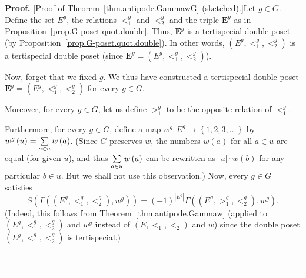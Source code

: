\documentclass[numbers=enddot,12pt,final,onecolumn,notitlepage,abstracton]{scrartcl}
\theoremstyle{definition}
\newenvironment{proof}[1][Proof]{\noindent\textbf{#1.} }{\ \rule{0.5em}{0.5em}}
\let\sumnonlimits\sum
\renewcommand{\sum}{\sumnonlimits\limits}
\newcommand{\EE}{{\mathbf{E}}}
\begin{document}
\begin{proof}
[Proof of Theorem~\ref{thm.antipode.GammawG} (sketched).]Let $g\in G$.
Define the set $E^g$, the relations $<_1^g$ and $<_2^g$
and the triple $\EE^g$ as in Proposition~\ref{prop.G-poset.quot.double}.
Thus, $\EE^g$ is a tertispecial double poset (by
Proposition~\ref{prop.G-poset.quot.double}). In other words,
$\left( E^g, <_1^g, <_2^g \right)$ is a tertispecial double poset
(since $\EE^g = \left( E^g, <_1^g, <_2^g \right)$).

Now, forget that we fixed $g$. We thus have constructed a
tertispecial double poset
$\EE^g = \left( E^g, <_1^g, <_2^g \right)$ for every $g \in G$.

Moreover, for every $g \in G$, let us define $>_1^g$ to be the
opposite relation of $<_1^g$.

Furthermore, for every $g\in G$, define a map $w^{g}:E^{g}\rightarrow
\left\{1,2,3,\ldots\right\}$
by $w^{g}\left(  u\right)  =\sum\limits_{a\in u}w\left(
a\right)  $. (Since $G$ preserves $w$, the numbers $w\left(  a\right)  $ for
all $a\in u$ are equal (for given $u$), and thus $\sum\limits_{a\in u}w\left(
a\right)  $ can be rewritten as $\left\vert u\right\vert \cdot w\left(
b\right)  $ for any particular $b\in u$. But we shall not use
this observation.)
Now, every $g \in G$ satisfies
\begin{equation}
S\left(  \Gamma\left(  \left(  E^{g},<_{1}^{g},<_{2}^{g}\right)
,w^{g}\right)  \right)  =\left(  -1\right)  ^{\left\vert E^{g}\right\vert
}\Gamma\left(  \left(  E^{g},>_{1}^{g},<_{2}^{g}\right)  ,w^{g}\right) .
\label{pf.thm.antipode.GammawG.S1}
\end{equation}
(Indeed, this follows from Theorem~\ref{thm.antipode.Gammaw}
(applied to $\left( E^g, <_1^g, <_2^g \right)$ and $w^g$
instead of $\left( E, <_1, <_2 \right)$ and $w$)
since the double poset
$\left( E^g, <_1^g, <_2^g \right)$ is tertispecial.)


\end{proof}
\end{document}
